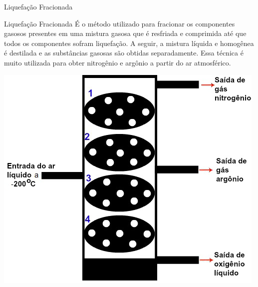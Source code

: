 \documentclass{beamer}
\begin{document}
\begin{frame}[label={sec:org61f8f64}]{Liquefação Fracionada}
\begin{block}{Liquefação Fracionada}
É o método utilizado para fracionar os componentes gasosos presentes em uma mistura gasosa que é resfriada e comprimida até que todos os componentes sofram liquefação. A seguir, a mistura líquida e homogênea é destilada e as substâncias gasosas são obtidas separadamente. Essa técnica é muito utilizada para obter nitrogênio e argônio a partir do ar atmosférico.

\begin{center}
\includegraphics[scale=0.38]{../img/liquefacao_fracionada.png}
\end{center}
\end{block}
\end{frame}
\end{document}
